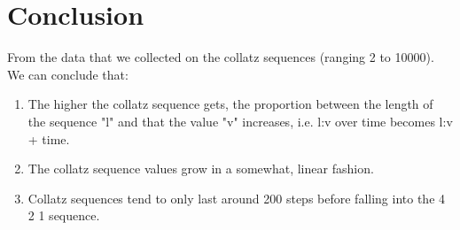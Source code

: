 \documentclass[11pt]{article}
\begin{document}
\section{Conclusion}

From the data that we collected on the collatz sequences (ranging 2 to 10000).
We can conclude that:

\begin{enumerate}
    \item
    The higher the collatz sequence gets, the proportion between the length of the sequence "l" 
and that the value "v" increases, i.e. l:v over time becomes l:v + time.
    \item
    The collatz sequence values grow in a somewhat, linear fashion. 
    \item
    Collatz sequences tend to only last around 200 steps before falling into the 4 2 1 sequence.
\end{enumerate}
\end{document}

